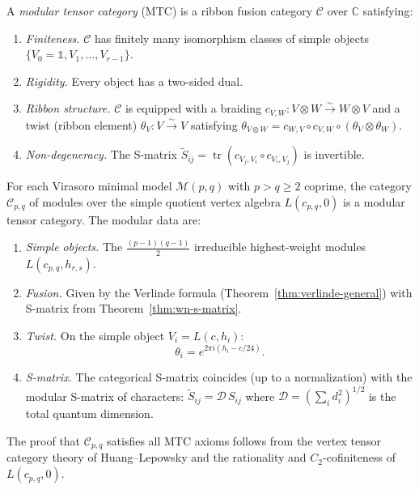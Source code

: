 \begin{definition}\label{def:modular-tensor-category}
A \emph{modular tensor category} (MTC) is a ribbon fusion category $\mathcal{C}$
over $\mathbb{C}$ satisfying:
\begin{enumerate}
\item \emph{Finiteness.} $\mathcal{C}$ has finitely many isomorphism classes of simple
objects $\{V_0 = \mathbb{1}, V_1, \ldots, V_{r-1}\}$.
\item \emph{Rigidity.} Every object has a two-sided dual.
\item \emph{Ribbon structure.} $\mathcal{C}$ is equipped with a braiding
$c_{V,W}\colon V \otimes W \xrightarrow{\sim} W \otimes V$ and a twist
(ribbon element) $\theta_V\colon V \xrightarrow{\sim} V$ satisfying
$\theta_{V \otimes W} = c_{W,V} \circ c_{V,W} \circ (\theta_V \otimes \theta_W)$.
\item \emph{Non-degeneracy.} The S-matrix $\tilde{S}_{ij} = \operatorname{tr}(c_{V_j,V_i}\circ c_{V_i,V_j})$
is invertible.
\end{enumerate}
\end{definition}

\begin{theorem}\label{thm:minimal-model-mtc}
For each Virasoro minimal model $\mathcal{M}(p,q)$ with $p > q \geq 2$
coprime, the category $\mathcal{C}_{p,q}$ of modules over the
simple quotient vertex algebra $L(c_{p,q}, 0)$ is a modular tensor
category. The modular data are:
\begin{enumerate}
\item \emph{Simple objects.} The $\frac{(p-1)(q-1)}{2}$ irreducible highest-weight
modules $L(c_{p,q}, h_{r,s})$.
\item \emph{Fusion.} Given by the Verlinde formula
(Theorem~\ref{thm:verlinde-general}) with S-matrix from
Theorem~\ref{thm:wn-s-matrix}.
\item \emph{Twist.} On the simple object $V_i = L(c, h_i)$:
\begin{equation}\label{eq:twist-minimal}
\theta_i = e^{2\pi i(h_i - c/24)}.
\end{equation}
\item \emph{S-matrix.} The categorical S-matrix coincides (up to a
normalization) with the modular S-matrix of characters:
$\tilde{S}_{ij} = \mathcal{D}\, S_{ij}$ where
$\mathcal{D} = (\sum_i d_i^2)^{1/2}$ is the total quantum dimension.
\end{enumerate}
The proof that $\mathcal{C}_{p,q}$ satisfies all MTC axioms follows from
the vertex tensor category theory of Huang--Lepowsky \cite{HLZ} and
the rationality and $C_2$-cofiniteness of $L(c_{p,q},0)$.
\end{theorem}

